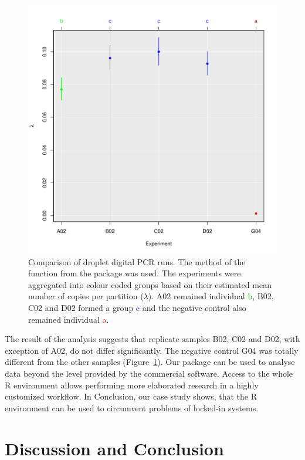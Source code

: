 \begin{figure}[htbp]
  \centering
  \includegraphics[trim=0.75cm 0.75cm 0.75cm 1.75cm, scale=0.5]{figures/test_counts.pdf}
  \caption{Comparison of droplet digital PCR runs. The  method of the 
 function from the  package was used. The 
experiments were aggregated into colour coded groups based on their estimated 
mean number of copies per partition ($\lambda$). A02 remained individual 
\textcolor{green}{b}, B02, C02 and D02 formed a group \textcolor{blue}{c} and 
the negative control also remained individual \textcolor{red}{a}.
}
  \label{figure:test_counts}
\end{figure}

The result of the analysis suggests that replicate samples B02, C02 and D02, with exception of A02,  
do not differ significantly. The negative control G04 was 
totally different from the other samples (Figure~\ref{figure:test_counts}). 
Our  package can be used to analyse data beyond the level provided by 
the commercial software. Access to the whole R environment allows performing 
more elaborated research in a highly customized workflow. In Conclusion, our 
case study shows, that the R environment can be used to circumvent problems of 
locked-in systems.

\section{Discussion and Conclusion}

